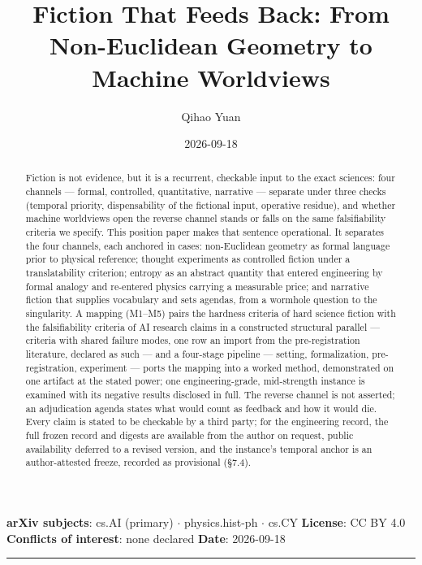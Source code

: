\documentclass[11pt,a4paper]{article}
\title{Fiction That Feeds Back: From Non-Euclidean Geometry to Machine Worldviews}
\author{Qihao Yuan}
\date{2026-09-18}
\begin{document}
\maketitle
\thispagestyle{empty}
\vspace{0.5em}
\noindent\textbf{arXiv subjects}: cs.AI (primary) $\cdot$ physics.hist-ph $\cdot$ cs.CY \quad \textbf{License}: CC BY 4.0 \quad \textbf{Conflicts of interest}: none declared \quad \textbf{Date}: 2026-09-18
\vspace{0.5em}
\hrule
\vspace{0.8em}

\begin{abstract}


Fiction is not evidence, but it is a recurrent, checkable input to the exact sciences: four channels — formal, controlled, quantitative, narrative — separate under three checks (temporal priority, dispensability of the fictional input, operative residue), and whether machine worldviews open the reverse channel stands or falls on the same falsifiability criteria we specify. This position paper makes that sentence operational. It separates the four channels, each anchored in cases: non-Euclidean geometry as formal language prior to physical reference; thought experiments as controlled fiction under a translatability criterion; entropy as an abstract quantity that entered engineering by formal analogy and re-entered physics carrying a measurable price; and narrative fiction that supplies vocabulary and sets agendas, from a wormhole question to the singularity. A mapping (M1–M5) pairs the hardness criteria of hard science fiction with the falsifiability criteria of AI research claims in a constructed structural parallel — criteria with shared failure modes, one row an import from the pre-registration literature, declared as such — and a four-stage pipeline — setting, formalization, pre-registration, experiment — ports the mapping into a worked method, demonstrated on one artifact at the stated power; one engineering-grade, mid-strength instance is examined with its negative results disclosed in full. The reverse channel is not asserted; an adjudication agenda states what would count as feedback and how it would die. Every claim is stated to be checkable by a third party; for the engineering record, the full frozen record and digests are available from the author on request, public availability deferred to a revised version, and the instance's temporal anchor is an author-attested freeze, recorded as provisional (§7.4).

\end{abstract}
\end{document}
